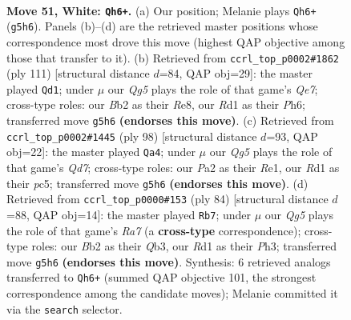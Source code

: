 \documentclass[11pt]{article}
\begin{document}
\clearpage

\begin{figure}[p]\centering
\begin{subfigure}{0.46\textwidth}\centering
\resizebox{\linewidth}{!}{%
\newchessgame
\chessboard[
  setfen={3q1k2/1b1n1p2/3P1n2/6Q1/p1p4P/5pP1/PB5K/3R4 w - - 2 51},
  showmover=false,
  pgfstyle=straightmove, color=movearrow, markmove={g5-h6}
]}
\caption{}
\end{subfigure}\hfill
\begin{subfigure}{0.46\textwidth}\centering
\resizebox{\linewidth}{!}{%
\newchessgame
\chessboard[
  setfen={4r1k1/5p2/6pp/1pPP4/6P1/1NQ1p2P/KR2q3/8 b - - 1 56},
  showmover=false,
  pgfstyle=straightmove, color=movearrow, markmove={e2-d1}
]}
\caption{}
\end{subfigure}
\\[4pt]
\begin{subfigure}{0.46\textwidth}\centering
\resizebox{\linewidth}{!}{%
\newchessgame
\chessboard[
  setfen={8/3Q2nk/5qp1/2pP3p/8/7P/2p3P1/4R2K w - - 0 50},
  showmover=false,
  pgfstyle=straightmove, color=movearrow, markmove={d7-a4}
]}
\caption{}
\end{subfigure}\hfill
\begin{subfigure}{0.46\textwidth}\centering
\resizebox{\linewidth}{!}{%
\newchessgame
\chessboard[
  setfen={3q1bk1/R1n2p2/5npp/4R3/3P4/1Q4PP/5P2/6K1 w - - 2 43},
  showmover=false,
  pgfstyle=straightmove, color=movearrow, markmove={a7-b7}
]}
\caption{}
\end{subfigure}
\caption{\textbf{Move 51, White: \texttt{Qh6+}.} (a) Our position; Melanie plays \texttt{Qh6+} (\texttt{g5h6}). Panels (b)--(d) are the retrieved master positions whose correspondence most drove this move (highest QAP objective among those that transfer to it). (b) Retrieved from \texttt{ccrl\_top\_p0002\#1862} (ply 111) [structural distance $d$=84, QAP obj=29]: the master played \texttt{Qd1}; under $\mu$ our \emph{Qg5} plays the role of that game's \emph{Qe7}; cross-type roles: our \emph{B}b2 as their \emph{R}e8, our \emph{R}d1 as their \emph{P}h6; transferred move \texttt{g5h6} \textbf{(endorses this move)}. (c) Retrieved from \texttt{ccrl\_top\_p0002\#1445} (ply 98) [structural distance $d$=93, QAP obj=22]: the master played \texttt{Qa4}; under $\mu$ our \emph{Qg5} plays the role of that game's \emph{Qd7}; cross-type roles: our \emph{P}a2 as their \emph{R}e1, our \emph{R}d1 as their \emph{p}c5; transferred move \texttt{g5h6} \textbf{(endorses this move)}. (d) Retrieved from \texttt{ccrl\_top\_p0000\#153} (ply 84) [structural distance $d$=88, QAP obj=14]: the master played \texttt{Rb7}; under $\mu$ our \emph{Qg5} plays the role of that game's \emph{Ra7} (a \textbf{cross-type} correspondence); cross-type roles: our \emph{B}b2 as their \emph{Q}b3, our \emph{R}d1 as their \emph{P}h3; transferred move \texttt{g5h6} \textbf{(endorses this move)}. Synthesis: 6 retrieved analogs transferred to \texttt{Qh6+} (summed QAP objective 101, the strongest correspondence among the candidate moves); Melanie committed it via the \texttt{search} selector.}
\label{fig:thought-m100}
\end{figure}
\end{document}
